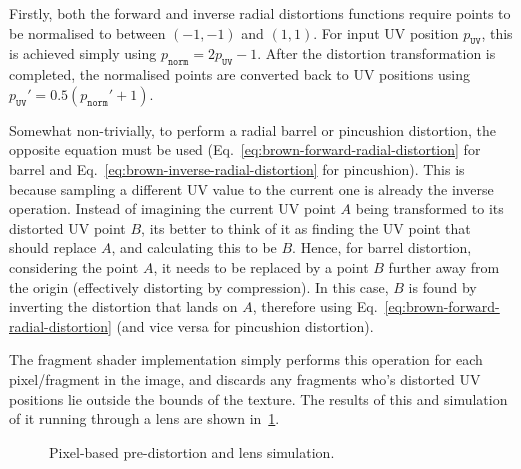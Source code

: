 Firstly, both the forward and inverse radial distortions functions require points to be normalised to between $(-1, -1)$ and $(1, 1)$.
For input UV position $p_{\texttt{UV}}$, this is achieved simply using $p_{\texttt{norm}} = 2 p_{\texttt{UV}} - 1$.
After the distortion transformation is completed, the normalised points are converted back to UV positions using $p_{\texttt{UV}}' = 0.5 (p_{\texttt{norm}}' + 1)$.

Somewhat non-trivially, to perform a radial barrel or pincushion distortion, the opposite equation must be used (Eq.~\ref{eq:brown-forward-radial-distortion} for barrel and Eq.~\ref{eq:brown-inverse-radial-distortion} for pincushion).
This is because sampling a different UV value to the current one is already the inverse operation.
Instead of imagining the current UV point $A$ being transformed to its distorted UV point $B$, its better to think of it as finding the UV point that should replace $A$, and calculating this to be $B$.
Hence, for barrel distortion, considering the point $A$, it needs to be replaced by a point $B$ further away from the origin (effectively distorting by compression).
In this case, $B$ is found by inverting the distortion that lands on $A$, therefore using Eq.~\ref{eq:brown-forward-radial-distortion} (and vice versa for pincushion distortion).

The fragment shader implementation simply performs this operation for each pixel/fragment in the image, and discards any fragments who's distorted UV positions lie outside the bounds of the texture.
The results of this and simulation of it running through a lens are shown in~\ref{fig:frag-based}.

\begin{figure}[ht]
    \centering

    \hfil
    
    \caption{Pixel-based pre-distortion and lens simulation.}
    \label{fig:frag-based}
\end{figure}

